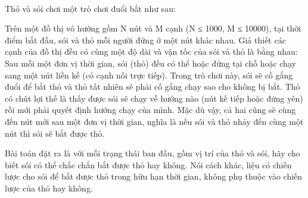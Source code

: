  

Thỏ và sói chơi một trò chơi đuổi bắt như sau:

Trên một đồ thị vô hướng gồm N nút và M cạnh (N ≤ 1000, M ≤ 10000), tại thời điểm bắt đầu, sói và thỏ mỗi người đứng ở một nút khác nhau. Giả thiết các cạnh của đồ thị đều có cùng một độ dài và vận tốc của sói và thỏ là bằng nhau: Sau mỗi một đơn vị thời gian, sói (thỏ) đều có thể hoặc đứng tại chỗ hoặc chạy sang một nút liền kề (có cạnh nối trực tiếp). Trong trò chơi này, sói sẽ cố gắng đuổi để bắt thỏ và thỏ tất nhiên sẽ phải cố gắng chạy sao cho không bị bắt. Thỏ có chút lợi thế là thấy được sói sẽ chạy về hướng nào (nút kế tiếp hoặc đứng yên) rồi mới phải quyết định hướng chạy của mình. Mặc dù vậy, cả hai cũng sẽ cùng đến nút mới sau một đơn vị thời gian, nghĩa là nếu sói và thỏ nhảy đến cùng một nút thì sói sẽ bắt được thỏ.

Bài toán đặt ra là với mỗi trạng thái ban đầu, gồm vị trí của thỏ và sói, hãy cho biết sói có thể chắc chắn bắt được thỏ hay không. Nói cách khác, liệu có chiến lược cho sói để bắt được thỏ trong hữu hạn thời gian, không phụ thuộc vào chiến lược của thỏ hay không.

\